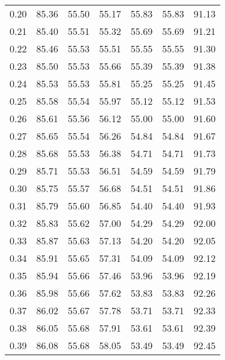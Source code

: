 \begin{tabular}{|c|c|c|c|c|c|c|}
      0.20 &     85.36 &     55.50 &      55.17 &   55.83 &      55.83 &         91.13 \\
      0.21 &     85.40 &     55.51 &      55.32 &   55.69 &      55.69 &         91.21 \\
      0.22 &     85.46 &     55.53 &      55.51 &   55.55 &      55.55 &         91.30 \\
      0.23 &     85.50 &     55.53 &      55.66 &   55.39 &      55.39 &         91.38 \\
      0.24 &     85.53 &     55.53 &      55.81 &   55.25 &      55.25 &         91.45 \\
      0.25 &     85.58 &     55.54 &      55.97 &   55.12 &      55.12 &         91.53 \\
      0.26 &     85.61 &     55.56 &      56.12 &   55.00 &      55.00 &         91.60 \\
      0.27 &     85.65 &     55.54 &      56.26 &   54.84 &      54.84 &         91.67 \\
      0.28 &     85.68 &     55.53 &      56.38 &   54.71 &      54.71 &         91.73 \\
      0.29 &     85.71 &     55.53 &      56.51 &   54.59 &      54.59 &         91.79 \\
      0.30 &     85.75 &     55.57 &      56.68 &   54.51 &      54.51 &         91.86 \\
      0.31 &     85.79 &     55.60 &      56.85 &   54.40 &      54.40 &         91.93 \\
      0.32 &     85.83 &     55.62 &      57.00 &   54.29 &      54.29 &         92.00 \\
      0.33 &     85.87 &     55.63 &      57.13 &   54.20 &      54.20 &         92.05 \\
      0.34 &     85.91 &     55.65 &      57.31 &   54.09 &      54.09 &         92.12 \\
      0.35 &     85.94 &     55.66 &      57.46 &   53.96 &      53.96 &         92.19 \\
      0.36 &     85.98 &     55.66 &      57.62 &   53.83 &      53.83 &         92.26 \\
      0.37 &     86.02 &     55.67 &      57.78 &   53.71 &      53.71 &         92.33 \\
      0.38 &     86.05 &     55.68 &      57.91 &   53.61 &      53.61 &         92.39 \\
      0.39 &     86.08 &     55.68 &      58.05 &   53.49 &      53.49 &         92.45 \\

\end{tabular}
